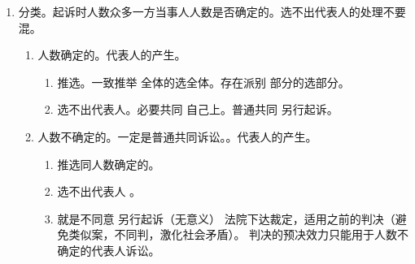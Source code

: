 \begin{enumerate}
\begin{enumerate}
                。
          \item 分类。起诉时人数众多一方当事人人数是否确定的。选不出代表人的处理不要混。
                \begin{enumerate}
                  \item 人数确定的。代表人的产生。
                        \begin{enumerate}
                          \item 推选。一致推举 \yjt 全体的选全体。存在派别 \yjt 部分的选部分。
                          \item 选不出代表人。必要共同 \yjt 自己上。普通共同 \yjt 另行起诉。
                        \end{enumerate}
                  \item 人数不确定的。一定是普通共同诉讼。。代表人的产生。
                        \begin{enumerate}
                          \item 推选同人数确定的。
                          \item 选不出代表人 \yjt
                                。
                          \item \sjt 就是不同意 \yjt
                                另行起诉（无意义） \yjt
                                法院下达裁定，适用之前的判决（避免类似案，不同判，激化社会矛盾）。
                                判决的预决效力只能用于人数不确定的代表人诉讼。
                        \end{enumerate}
                \end{enumerate}
        \end{enumerate}
\end{enumerate}
